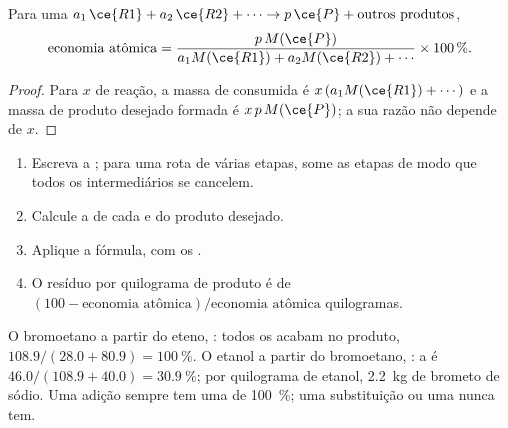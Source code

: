 \begin{proposition}\label{prop:g12:synthesis-strategy:atom-economy}
Para uma  $a_1\,\ce{R1} + a_2\,\ce{R2} + \cdots \rightarrow
p\,\ce{P} + \text{outros produtos}$,
\[
  \text{economia atômica} =
  \frac{p\,M(\ce{P})}{a_1 M(\ce{R1}) + a_2 M(\ce{R2}) + \cdots}
  \times 100\,\% .
\]
\end{proposition}

\begin{proof}
Para $x$  de reação, a massa de  consumida é
$x\,(a_1 M(\ce{R1}) + \cdots)$ e a massa de produto desejado formada é
$x\,p\,M(\ce{P})$; a sua razão não depende de $x$.
\end{proof}

\begin{method}\label{met:g12:synthesis-strategy:atom-economy}
\begin{enumerate}
  \item Escreva a ; para uma rota de várias etapas,
        some as etapas de modo que todos os intermediários se cancelem.
  \item Calcule a  de cada  e do produto desejado.
  \item Aplique a fórmula, com os .
  \item O resíduo por quilograma de produto é de
        $(100 - \text{economia atômica})/\text{economia atômica}$ quilogramas.
\end{enumerate}
\end{method}

\begin{example}\label{ex:g12:synthesis-strategy:compare}
O bromoetano a partir do eteno, : todos os
 acabam no produto,  $108.9/(28.0 + 80.9) = \qty{100}{\percent}$.
O etanol a partir do bromoetano, : a
 é $46.0/(108.9 + 40.0) = \qty{30.9}{\percent}$; por
quilograma de etanol, \qty{2.2}{kg} de brometo de sódio. Uma adição
sempre tem uma  de \qty{100}{\percent}; uma substituição
ou uma  nunca tem.
\end{example}

